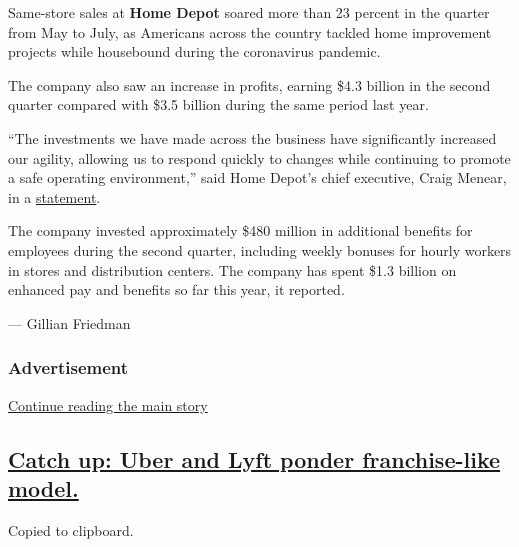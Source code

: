 Same-store sales at \textbf{Home Depot} soared more than 23 percent in
the quarter from May to July, as Americans across the country tackled
home improvement projects while housebound during the coronavirus
pandemic.

The company also saw an increase in profits, earning \$4.3 billion in
the second quarter compared with \$3.5 billion during the same period
last year.

``The investments we have made across the business have significantly
increased our agility, allowing us to respond quickly to changes while
continuing to promote a safe operating environment,'' said Home Depot's
chief executive, Craig Menear, in a
\href{https://corporate.homedepot.com/newsroom/news-release-home-depot-announces-second-quarter-2020-results}{statement}.

The company invested approximately \$480 million in additional benefits
for employees during the second quarter, including weekly bonuses for
hourly workers in stores and distribution centers. The company has spent
\$1.3 billion on enhanced pay and benefits so far this year, it
reported.

--- Gillian Friedman

\hypertarget{advertisement-1}{%
\subsubsection{Advertisement}\label{advertisement-1}}

\protect\hyperlink{after-dfp-ad-mid2}{Continue reading the main story}

\hypertarget{catch-up-uber-and-lyft-ponder-franchise-like-model}{%
\subsection{\texorpdfstring{\protect\hyperlink{catch-up-uber-and-lyft-ponder-franchise-like-model}{Catch
up: Uber and Lyft ponder franchise-like
model.}}{Catch up: Uber and Lyft ponder franchise-like model.}}\label{catch-up-uber-and-lyft-ponder-franchise-like-model}}

Copied to clipboard.

